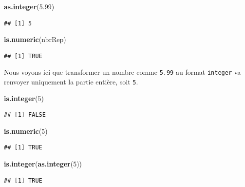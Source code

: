 \documentclass[twoside,symmetric]{book}
\newenvironment{Shaded}{}{}
\newcommand{\DecValTok}[1]{#1}
\newcommand{\FloatTok}[1]{#1}
\newcommand{\KeywordTok}[1]{\textbf{#1}}
\newcommand{\NormalTok}[1]{#1}
\begin{document}
\begin{Shaded}
\begin{Highlighting}[]
\KeywordTok{as.integer}\NormalTok{(}\FloatTok{5.99}\NormalTok{)}
\end{Highlighting}
\end{Shaded}

\begin{verbatim}
## [1] 5
\end{verbatim}

\begin{Shaded}
\begin{Highlighting}[]
\KeywordTok{is.numeric}\NormalTok{(nbrRep)}
\end{Highlighting}
\end{Shaded}

\begin{verbatim}
## [1] TRUE
\end{verbatim}

Nous voyons ici que transformer un nombre comme \texttt{5.99} au format \texttt{integer} va renvoyer uniquement la partie entière, soit \texttt{5}.

\begin{Shaded}
\begin{Highlighting}[]
\KeywordTok{is.integer}\NormalTok{(}\DecValTok{5}\NormalTok{)}
\end{Highlighting}
\end{Shaded}

\begin{verbatim}
## [1] FALSE
\end{verbatim}

\begin{Shaded}
\begin{Highlighting}[]
\KeywordTok{is.numeric}\NormalTok{(}\DecValTok{5}\NormalTok{)}
\end{Highlighting}
\end{Shaded}

\begin{verbatim}
## [1] TRUE
\end{verbatim}

\begin{Shaded}
\begin{Highlighting}[]
\KeywordTok{is.integer}\NormalTok{(}\KeywordTok{as.integer}\NormalTok{(}\DecValTok{5}\NormalTok{))}
\end{Highlighting}
\end{Shaded}

\begin{verbatim}
## [1] TRUE
\end{verbatim}
\end{document}
